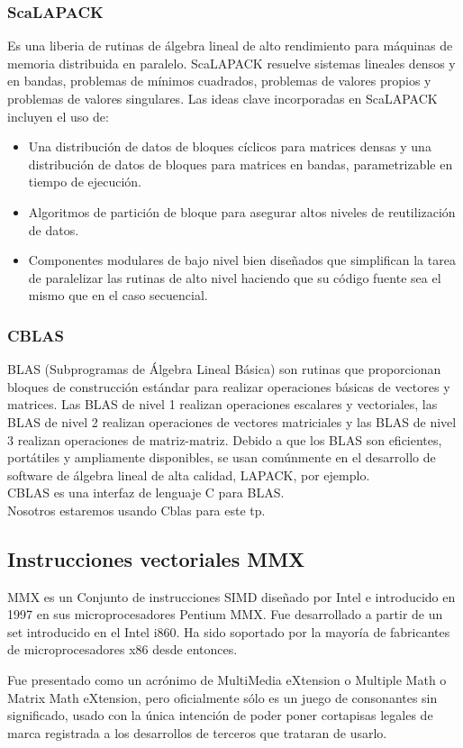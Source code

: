     \subsubsection{ScaLAPACK}
        Es una liberia de rutinas de álgebra lineal de alto rendimiento para máquinas
        de memoria distribuida en paralelo. ScaLAPACK resuelve sistemas lineales
        densos y en bandas, problemas de mínimos cuadrados, problemas de valores
        propios y problemas de valores singulares. Las ideas clave incorporadas en
        ScaLAPACK incluyen el uso de:
        \begin{itemize}
            \item Una distribución de datos de bloques cíclicos para matrices densas
            y una distribución de datos de bloques para matrices en bandas,
            parametrizable en tiempo de ejecución.
            \item Algoritmos de partición de bloque para asegurar altos niveles de
            reutilización de datos.
            \item Componentes modulares de bajo nivel bien diseñados que simplifican
            la tarea de paralelizar las rutinas de alto nivel haciendo que su código
            fuente sea el mismo que en el caso secuencial.
        \end{itemize}

    \subsubsection{CBLAS}
        BLAS (Subprogramas de Álgebra Lineal Básica) son rutinas que proporcionan
        bloques de construcción estándar para realizar operaciones básicas de
        vectores y matrices. Las BLAS de nivel 1 realizan operaciones escalares
        y vectoriales, las BLAS de nivel 2 realizan operaciones de
        vectores matriciales y las BLAS de nivel 3 realizan operaciones
        de matriz-matriz. Debido a que los BLAS son eficientes, portátiles y
        ampliamente disponibles, se usan comúnmente en el desarrollo de software
        de álgebra lineal de alta calidad, LAPACK, por ejemplo.\\
        CBLAS es una interfaz de lenguaje C para BLAS.\\
        Nosotros estaremos usando Cblas para este tp.

\subsection{Instrucciones vectoriales MMX}
    MMX es un Conjunto de instrucciones SIMD diseñado por Intel e introducido en
    1997 en sus microprocesadores Pentium MMX. Fue desarrollado a partir de un
    set introducido en el Intel i860. Ha sido soportado por la mayoría de
    fabricantes de microprocesadores x86 desde entonces.

    Fue presentado como un acrónimo de MultiMedia eXtension o Multiple Math o
    Matrix Math eXtension, pero oficialmente sólo es un juego de consonantes
    sin significado, usado con la única intención de poder poner cortapisas
    legales de marca registrada a los desarrollos de terceros que trataran de
    usarlo.
